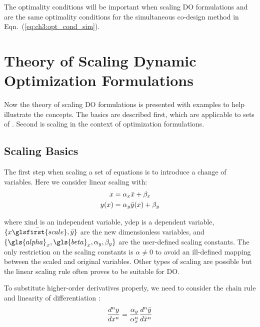 The optimality conditions will be important when scaling DO formulations and are the same optimality conditions for the simultaneous co-design method in Eqn.~(\ref{eq:ch3:opt_cond_sim}).

\section{Theory of Scaling Dynamic Optimization Formulations\label{sec:ch4:theory}}

Now the theory of scaling DO formulations is presented with examples to help illustrate the concepts.
The basics are described first, which are applicable to sets of .
Second is scaling in the context of optimization formulations.

\subsection{Scaling Basics \label{sec:ch4:basics}}

The first step when scaling a set of equations is to introduce a change of variables. Here we consider linear scaling with:
\begin{subequations}
\label{eq:ch4:scale}
\begin{align}
x &= \alpha_x \bar{x} + \beta_x \\
y(x) &= \alpha_y \bar{y}(x) + \beta_y
\end{align}
\end{subequations}

\noindent where \gls{xind} is an independent variable, \gls{ydep} is a dependent variable, $\{ \mybar{x\glsfirst{scale}}, \mybar{y} \}$ are the new dimensionless variables, and $\{ \gls{alpha}_x, \gls{beta}_x, \alpha_y, \beta_y \}$ are the user-defined scaling constants. The only restriction on the scaling constants is $\alpha \neq 0$ to avoid an ill-defined mapping between the scaled and original variables. Other types of scaling are possible \cite{Boyd2009a} but the linear scaling rule often proves to be suitable for DO.

To substitute higher-order derivatives properly, we need to consider the chain rule and linearity of differentiation \cite{Strang1991a}:
\begin{align}
\label{eq:ch4:derivative}
\frac{d^n y}{d x^n} = \frac{\alpha_y}{\alpha_x^n} \frac{d^n \bar{y}}{d \bar{x}^n}
\end{align}

